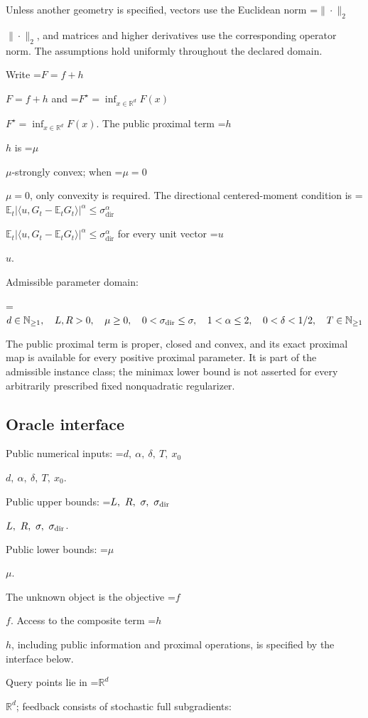 \documentclass[10pt,a4paper]{article}
\newcommand{\AtlasMath}[1]{\par\begingroup\centering\setbox0=\hbox{$\displaystyle #1$}\ifdim\wd0>1.4\linewidth\typeout{ATLAS WIDE FORMULA: \the\wd0}\fi\ifdim\wd0>\linewidth\resizebox{\linewidth}{!}{\box0}\else\box0\fi\par\endgroup}
\newcommand{\AtlasInlineMath}[1]{\begingroup\setbox0=\hbox{$#1$}\ifdim\wd0>.4\linewidth\endgroup\AtlasMath{#1}\else\endgroup$#1$\fi}
\begin{document}
Unless another geometry is specified, vectors use the Euclidean norm \AtlasInlineMath{\|\cdot\|_2}, and matrices and higher derivatives use the corresponding operator norm. The assumptions hold uniformly throughout the declared domain.



Write \AtlasInlineMath{F=f+h} and \AtlasInlineMath{F^\star=\inf_{x\in\mathbb R^d}F(x)}. The public proximal term \AtlasInlineMath{h} is \AtlasInlineMath{\mu}-strongly convex; when \AtlasInlineMath{\mu=0}, only convexity is required. The directional centered-moment condition is \AtlasInlineMath{\mathbb E_t|\langle u,G_t-\mathbb E_tG_t\rangle|^\alpha\le\sigma_{\mathrm{dir}}^\alpha} for every unit vector \AtlasInlineMath{u}.



Admissible parameter domain:


\AtlasMath{d\in\mathbb{N}_{\ge1},\quad L,R>0,\quad\mu\ge0,\quad0<\sigma_{\rm dir}\le\sigma,\quad1<\alpha\le2,\quad0<\delta<1/2,\quad T\in\mathbb{N}_{\ge1}}




The public proximal term is proper, closed and convex, and its exact proximal map is available for every positive proximal parameter. It is part of the admissible instance class; the minimax lower bound is not asserted for every arbitrarily prescribed fixed nonquadratic regularizer.



\subsection{Oracle interface}


Public numerical inputs: \AtlasInlineMath{d,\ \alpha,\ \delta,\ T,\ x_0}.



Public upper bounds: \AtlasInlineMath{L,\ R,\ \sigma,\ \sigma_{\rm dir}}.



Public lower bounds: \AtlasInlineMath{\mu}.



The unknown object is the objective \AtlasInlineMath{f}. Access to the composite term \AtlasInlineMath{h}, including public information and proximal operations, is specified by the interface below.



Query points lie in \AtlasInlineMath{\mathbb{R}^d}; feedback consists of stochastic full subgradients:
\end{document}
